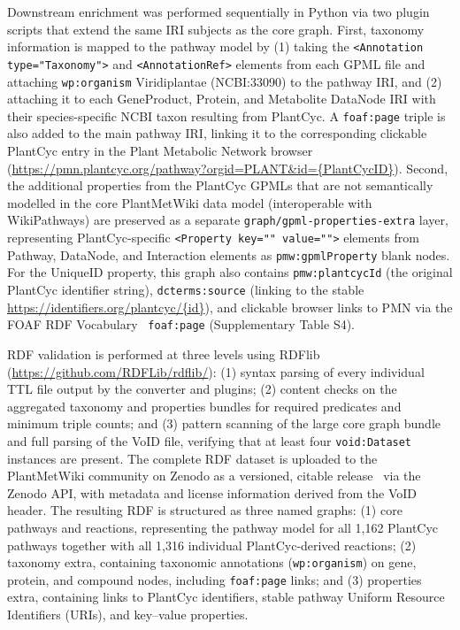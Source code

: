 \documentclass[11pt,a4paper]{article}
\begin{document}
Downstream enrichment was performed sequentially in Python via two plugin scripts that extend the same
IRI subjects as the core graph. First, taxonomy information is mapped to the pathway model by (1)
taking the \texttt{<Annotation type="Taxonomy">} and \texttt{<AnnotationRef>} elements from each GPML
file and attaching \texttt{wp:organism} Viridiplantae (NCBI:33090) to the pathway IRI, and (2)
attaching it to each GeneProduct, Protein, and Metabolite DataNode IRI with their species-specific
NCBI taxon resulting from PlantCyc. A \texttt{foaf:page} triple is also added to the main pathway IRI,
linking it to the corresponding clickable PlantCyc entry in the Plant Metabolic Network browser
(\url{https://pmn.plantcyc.org/pathway?orgid=PLANT&id={PlantCycID}}). Second, the additional
properties from the PlantCyc GPMLs that are not semantically modelled in the core PlantMetWiki data
model (interoperable with WikiPathways) are preserved as a separate \texttt{graph/\allowbreak{}gpml-\allowbreak{}properties-\allowbreak{}extra}
layer, representing PlantCyc-specific \texttt{<Property key="" value="">} elements from Pathway,
DataNode, and Interaction elements as \texttt{pmw:gpmlProperty} blank nodes. For the UniqueID
property, this graph also contains \texttt{pmw:plantcycId} (the original PlantCyc identifier string),
\texttt{dcterms:source} (linking to the stable \url{https://identifiers.org/plantcyc/{id}}), and
clickable browser links to PMN via the FOAF RDF Vocabulary~\cite{brickley_foaf} \texttt{foaf:page}
(Supplementary Table S4).

RDF validation is performed at three levels using RDFlib (\url{https://github.com/RDFLib/rdflib/}):
(1) syntax parsing of every individual TTL file output by the converter and plugins; (2) content
checks on the aggregated taxonomy and properties bundles for required predicates and minimum triple
counts; and (3) pattern scanning of the large core graph bundle and full parsing of the VoID file,
verifying that at least four \texttt{void:Dataset} instances are present. The complete RDF dataset is
uploaded to the PlantMetWiki community on Zenodo as a versioned, citable
release~\cite{delpup2026rdf} via the Zenodo API, with metadata and license
information derived from the VoID header. The resulting RDF is structured as three
named graphs: (1) core pathways and reactions, representing the pathway model for all 1,162 PlantCyc
pathways together with all 1,316 individual PlantCyc-derived reactions; (2) taxonomy extra,
containing taxonomic annotations (\texttt{wp:organism}) on gene, protein, and compound nodes,
including \texttt{foaf:page} links; and (3) properties extra, containing links to PlantCyc
identifiers, stable pathway Uniform Resource Identifiers (URIs), and key--value properties.
\end{document}
